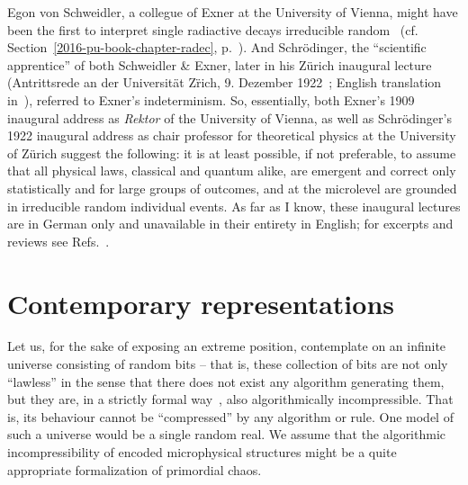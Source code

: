 Egon von Schweidler, a collegue of Exner at the University of Vienna,
might have been the first to interpret single
radiactive decays irreducible random~\cite{schweidler-1905} (cf. Section~\ref{2016-pu-book-chapter-radec}, p.~\pageref{2016-pu-book-chapter-radec}).
And Schr\"odinger, the ``scientific apprentice'' of both Schweidler \& Exner, later in his Z\"urich inaugural lecture
(Antrittsrede an der Universit\"at Z\"rich, 9. Dezember 1922~\cite{schrodinger-1929}; English translation in~\cite[Chapter~VI, p-107-118]{book:16081}),
referred to Exner's indeterminism.
So, essentially, both Exner's 1909  inaugural address as {\it Rektor}
of the University of Vienna,  as well as Schr\"odinger's 1922 inaugural address as chair professor
for theoretical physics at the University of Z\"urich
suggest the following: it is at least possible, if not preferable, to assume that
all physical laws, classical and quantum alike, are emergent and correct only statistically and for large groups of outcomes,
and at the microlevel are grounded in irreducible random individual events.
As far as I know, these inaugural lectures are in German only and unavailable in their entirety in English;
for excerpts and reviews see Refs.~\cite{Hanley-1979,Stoeltzner-1999,Stoeltzner-2000,Stoeltzner-2003}.


\section{Contemporary representations}

Let us, for the sake of exposing an extreme position, contemplate on an infinite universe
consisting of random bits -- that is, these collection of bits are not only ``lawless''
in the sense that there does not exist any algorithm generating them,
but they are, in a strictly formal way~\cite{ml:70,chaitin-99,calude:02}, also algorithmically incompressible.
That is, its behaviour cannot be ``compressed'' by any algorithm or rule.
One model of such a universe would be a single random real.
We assume that the algorithmic incompressibility of encoded microphysical structures
might be a quite appropriate formalization of primordial chaos.

